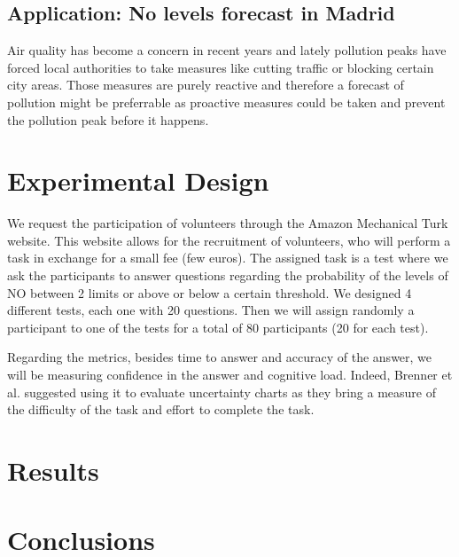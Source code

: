 \documentclass[a4paper,3p,sort&compress]{elsarticle}
\begin{document}
\subsection{Application: No levels forecast in Madrid}

Air quality has become a concern in recent years and lately pollution peaks have forced local authorities to take measures like cutting traffic or blocking certain city areas. Those measures are purely reactive and therefore a forecast of pollution might be preferrable as proactive measures could be taken and prevent the pollution peak before it happens.

\section{Experimental Design}
\label{sec:exp_design}

    We request the participation of volunteers through the Amazon Mechanical Turk website. This website allows for the recruitment of volunteers, who will perform a task in exchange for a small fee (few euros). The assigned task is a test where we ask the participants to answer questions regarding the probability of the levels of NO between 2 limits or above or below a certain threshold. 
We designed 4 different tests, each one with 20 questions. Then we will assign randomly a participant to one of the tests for a total of 80 participants (20 for each test).

Regarding the metrics, besides time to answer and accuracy of the answer, we will be measuring confidence in the answer and cognitive load. Indeed, Brenner et al. suggested using it to evaluate uncertainty charts as they bring a measure of the difficulty of the task and effort to complete the task.

\section{Results}
\label{sec:results}

\section{Conclusions}
\label{sec:concl}


\end{document}
